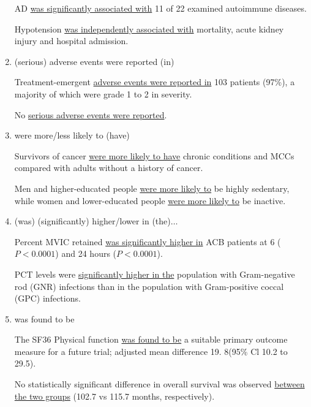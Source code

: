 \documentclass[a4paper]{ctexbook}
\begin{document}
\begin{enumerate}
      \begin{eg}{}
        AD \uline{was significantly associated with} 11 of 22 examined autoimmune diseases.   
      \end{eg}

      \begin{eg}{}
        Hypotension \uline{was independently associated with} mortality, acute kidney injury and hospital admission.    
      \end{eg}

      \item (serious) adverse events were reported (in)
      \begin{eg}{}
        Treatment-emergent \uline{adverse events were reported in} 103 patients (97\%), a majority of which were grade 1 to 2 in severity.
      \end{eg}

      \begin{eg}{}
        No \uline{serious adverse events were reported}.    
      \end{eg}

      \item were more/less likely to (have)
      \begin{eg}{}
        Survivors of cancer \uline{were more likely to have} chronic conditions and MCCs compared with adults without a history of cancer. 
      \end{eg}

      \begin{eg}{}
        Men and higher-educated people \uline{were more likely to} be highly sedentary, while women and lower-educated people \uline{were more likely to} be inactive.
      \end{eg}

      \item (was) (significantly) higher/lower in (the)$\dots$
      \begin{eg}{}
        Percent MVIC retained \uline{was significantly higher in} ACB patients at 6 ($P<0. 000 1$) and 24 hours ($P<0. 000 1$).         
      \end{eg}

      \begin{eg}{}
        PCT levels were \uline{significantly higher in the} population with Gram-negative rod (GNR) infections than in the population with Gram-positive coccal (GPC) infections.         
      \end{eg}

      \item was found to be
      \begin{eg}{}
        The SF36 Physical function \uline{was found to be} a suitable primary outcome measure for a future trial; adjusted mean difference 19. 8(95\% Cl 10.2 to 29.5).   
      \end{eg}

      \begin{eg}{}
        No statistically significant difference in overall survival was observed \uline{between the two groups} (102.7 vs 115.7 months, respectively). 
      \end{eg}
    \end{enumerate}
\end{document}
